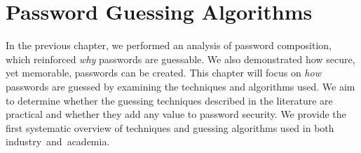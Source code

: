 \chapter{Password Guessing Algorithms}
\label{chp5::password-guessing-algorithms}

In the previous chapter, we performed an analysis of password composition, which reinforced \textit{why} passwords are guessable. We also demonstrated how secure, yet memorable, passwords can be created. This chapter will focus on \textit{how} passwords are guessed by examining the techniques and algorithms used. We aim to determine whether the guessing techniques described in the literature are practical and whether they add any value to password security. We provide the first systematic overview of techniques and guessing algorithms used in both industry~and~academia.







%  

